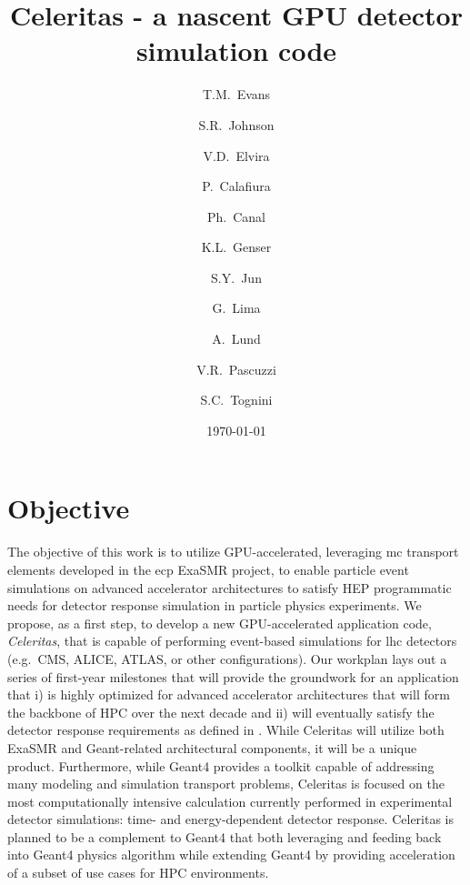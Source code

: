 \documentclass[10pt]{article}
\author[1]{T.M.~Evans}
\author[1]{S.R.~Johnson}
\author[2]{V.D.~Elvira}
\author[3]{P.~Calafiura}
\author[2]{Ph.~Canal}
\author[2]{K.L.~Genser}
\author[2]{S.Y.~Jun}
\author[2]{G.~Lima}
\author[4]{A.~Lund}
\author[3]{V.R.~Pascuzzi}
\author[1]{S.C.~Tognini}
\affil[1]{Oak Ridge National Laboratory}
\affil[2]{Fermi National Accelerator Laboratory}
\affil[3]{Lawrence Berkeley National Laboratory}
\affil[4]{Argonne National Laboratory}
\title{Celeritas - a nascent GPU detector simulation code}
\date{\today}
\begin{document}
\maketitle

\section*{Objective}

The objective of this work is to utilize GPU-accelerated, leveraging \ac{mc}
transport elements developed in the \ac{ecp}
ExaSMR project, to enable particle event simulations on advanced
accelerator architectures to satisfy HEP programmatic needs for detector
response simulation in particle physics experiments. We propose, as a first step,
to develop a new GPU-accelerated application code, \emph{Celeritas},
that is capable of performing event-based simulations for \ac{lhc} detectors
(e.g.~CMS, ALICE, ATLAS, or other configurations). Our workplan lays out
a series of first-year milestones that will provide the groundwork for
an application that i) is highly optimized for advanced accelerator
architectures that will form the backbone of HPC over the next decade
and ii) will eventually satisfy the detector response requirements as
defined in  \cite{the_hep_software_foundation_roadmap_2019}. While Celeritas will
utilize both ExaSMR and Geant-related architectural components, it will
be a unique product. Furthermore, while Geant4 provides a toolkit
capable of addressing many modeling and simulation transport problems,
Celeritas is focused on the most computationally intensive calculation
currently performed in experimental detector simulations: time-
and energy-dependent detector response.  Celeritas is planned to be a complement to Geant4 that both leveraging and feeding back into Geant4 physics algorithm while extending Geant4 by providing acceleration of a subset of use cases for HPC environments.
\end{document}
